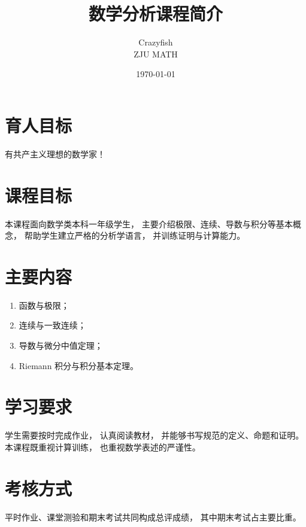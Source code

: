 \documentclass[UTF8]{ctexart}
\title{数学分析课程简介}
\author{Crazyfish  \\ ZJU MATH}
\date{\today}
\begin{document}
\maketitle

\section{育人目标}

有共产主义理想的数学家！

\section{课程目标}

本课程面向数学类本科一年级学生，
主要介绍极限、连续、导数与积分等基本概念，
帮助学生建立严格的分析学语言，
并训练证明与计算能力。

\section{主要内容}

\begin{enumerate}
  \item 函数与极限；
  \item 连续与一致连续；
  \item 导数与微分中值定理；
  \item Riemann 积分与积分基本定理。
\end{enumerate}

\section{学习要求}

学生需要按时完成作业，
认真阅读教材，
并能够书写规范的定义、命题和证明。
本课程既重视计算训练，
也重视数学表述的严谨性。

\section{考核方式}

平时作业、课堂测验和期末考试共同构成总评成绩，
其中期末考试占主要比重。
\end{document}
